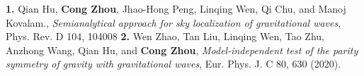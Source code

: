 
\begin{cventries}
\vspace{-0.45cm}
  \cventry
    {}
    {}
    {}
    {}
    {\textbf{1.} \textnormal{Qian Hu, \textbf{Cong Zhou}, Jhao-Hong Peng, Linqing Wen, Qi Chu, and Manoj Kovalam., \textsl{Semianalytical approach for sky localization of gravitational waves}, Phys. Rev. D 104, 104008}}
  \vspace{-0.2cm}
  \cventry
  {}
  {}
  {}
  {}
  {\textbf{2.} \textnormal{Wen Zhao, Tan Liu, Linqing Wen, Tao Zhu, Anzhong Wang, Qian Hu, and \textbf{Cong Zhou},  \textsl{Model-independent test of the parity symmetry of gravity with gravitational waves}, Eur. Phys. J. C 80, 630 (2020).}}
\vspace{-0.35cm}
\end{cventries}